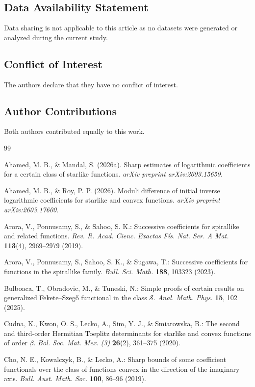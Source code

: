 \documentclass[11pt]{article}
\numberwithin{equation}{section}
\begin{document}
\subsection*{Data Availability Statement}
Data sharing is not applicable to this article as no datasets were generated or analyzed during the current study.
\subsection*{Conflict of Interest}
The authors declare that they have no conflict of interest. 
\subsection*{Author Contributions}
Both authors contributed equally to this work.

\begin{thebibliography}{99}

 Ahamed, M. B., \& Mandal, S. (2026a). Sharp estimates of logarithmic coefficients for a certain class of starlike functions. \emph{arXiv preprint arXiv:2603.15659}.

 Ahamed, M. B., \& Roy, P. P. (2026). Moduli difference of initial inverse logarithmic coefficients for starlike and convex functions. \emph{arXiv preprint arXiv:2603.17600}.

 Arora, V., Ponnusamy, S., \& Sahoo, S. K.: Successive coefficients for spirallike and related functions. \emph{Rev. R. Acad. Cienc. Exactas F\'is. Nat. Ser. A Mat.} \textbf{113}(4), 2969--2979 (2019).

 Arora, V., Ponnusamy, S., Sahoo, S. K., \& Sugawa, T.: Successive coefficients for functions in the spirallike family. \emph{Bull. Sci. Math.} \textbf{188}, 103323 (2023).

 Bulboaca, T., Obradovic, M., \& Tuneski, N.: Simple proofs of certain results on generalized Fekete--Szeg\H{o} functional in the class $\mathcal{S}$. \emph{Anal. Math. Phys.} \textbf{15}, 102 (2025).

 Cudna, K., Kwon, O. S., Lecko, A., Sim, Y. J., \& Smiarowska, B.: The second and third-order Hermitian Toeplitz determinants for starlike and convex functions of order $\beta$. \emph{Bol. Soc. Mat. Mex. (3)} \textbf{26}(2), 361--375 (2020).

 Cho, N. E., Kowalczyk, B., \& Lecko, A.: Sharp bounds of some coefficient functionals over the class of functions convex in the direction of the imaginary axis. \emph{Bull. Aust. Math. Soc.} \textbf{100}, 86--96 (2019).


\end{thebibliography}
\end{document}

